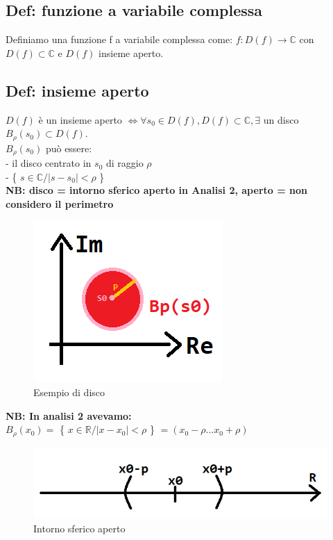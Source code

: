 \subsection{Def: funzione a variabile complessa}
Definiamo una funzione f a variabile complessa come:
$ f: D(f) \longrightarrow \mathbb{C} $ con $ D(f)\subset \mathbb{C} $ e $ D(f) $ insieme aperto.

\subsection{Def: insieme aperto}
$ D(f) $ è un insieme aperto $ \Leftrightarrow \forall s_{0} \in D(f) , D(f)\subset \mathbb{C} , \exists $ un disco $ B_{\rho}(s_{0}) \subset D(f)$. \\
$ B_{\rho}(s_{0})$ può essere:\\
- il disco centrato in $ s_{0}$ di raggio $ \rho $\\
- \{ $ s \in \mathbb{C} / |s-s_{0}| < \rho $ \}\\

\textbf{NB: disco = intorno sferico aperto in Analisi 2, aperto = non considero il perimetro}

\begin{figure}[h]
	\centering
	\includegraphics[scale=0.75]{immagini/disco}
	\caption{ Esempio di disco }
	\label{fig: esempioDisco}
\end{figure}


\textbf{NB: In analisi 2 avevamo: } \\
$ B_{\rho}(x_{0}) = $ \{ $ x \in \mathbb{R} / |x-x_{0}| < \rho $ \} $ = ( x_{0}-\rho ... x_{0}+\rho) $

\begin{figure}[h]
	\centering
	\includegraphics[scale=0.5]{immagini/intornoSfericoAperto}
	\caption{ Intorno sferico aperto }
	\label{fig: intornoSfericoAperto}
\end{figure}

